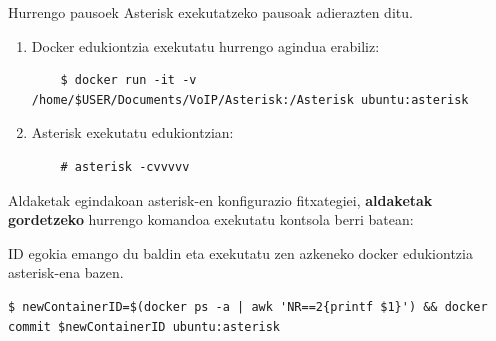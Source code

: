 Hurrengo pausoek Asterisk exekutatzeko pausoak adierazten ditu.
\begin{enumerate}
    \item Docker edukiontzia exekutatu hurrengo agindua erabiliz:
    \begin{verbatim}
    $ docker run -it -v /home/$USER/Documents/VoIP/Asterisk:/Asterisk ubuntu:asterisk
    \end{verbatim}
    \item Asterisk exekutatu edukiontzian:
    \begin{verbatim}
    # asterisk -cvvvvv
    \end{verbatim}
\end{enumerate}

Aldaketak egindakoan asterisk-en konfigurazio fitxategiei, \textbf{aldaketak gordetzeko} hurrengo komandoa exekutatu kontsola berri batean:
\begin{important}
    ID egokia emango du baldin eta exekutatu zen azkeneko docker edukiontzia asterisk-ena bazen.
\end{important}
\begin{verbatim}
$ newContainerID=$(docker ps -a | awk 'NR==2{printf $1}') && docker commit $newContainerID ubuntu:asterisk
\end{verbatim}